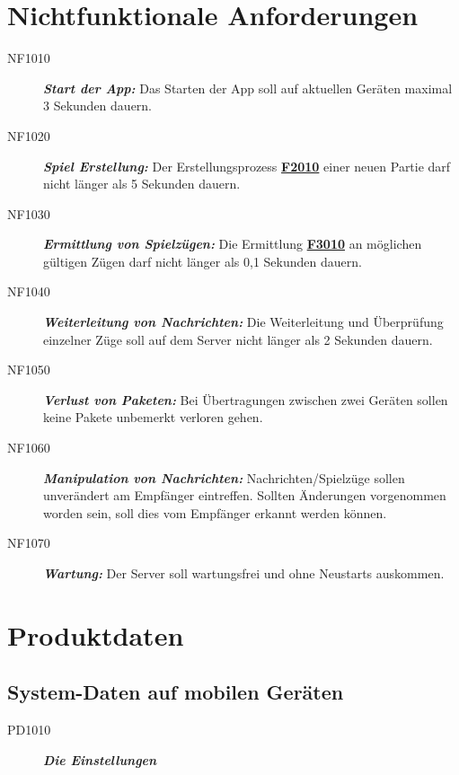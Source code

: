 \documentclass[parskip=full]{scrartcl}
\begin{document}
\section{Nichtfunktionale Anforderungen}
\begin{description}
	
	\item[NF1010] \textbf{\textit{Start der App: }} Das Starten der App soll auf aktuellen Geräten maximal 3 Sekunden dauern. 
	\item[NF1020] \textbf{\textit{Spiel Erstellung: }} Der Erstellungsprozess \hyperlink{F2010}{\textbf{F2010}} einer neuen Partie darf nicht länger als 5 Sekunden dauern.
	\item[NF1030] \textbf{\textit{Ermittlung von Spielzügen: }} Die Ermittlung \hyperlink{F3010}{\textbf{F3010}} an möglichen gültigen Zügen darf nicht länger als 0,1 Sekunden dauern.
	\item[NF1040] \textbf{\textit{Weiterleitung von Nachrichten: }} Die Weiterleitung und Überprüfung einzelner Züge soll auf dem Server nicht länger als 2 Sekunden dauern.
	\item[NF1050] \textbf{\textit{Verlust von Paketen: }} Bei Übertragungen zwischen zwei Geräten sollen keine Pakete unbemerkt verloren gehen.
	\item[NF1060] \textbf{\textit{Manipulation von Nachrichten: }} Nachrichten/Spielzüge sollen unverändert am Empfänger eintreffen. Sollten Änderungen vorgenommen worden sein, soll dies vom Empfänger erkannt werden können.
	\item[NF1070] \textbf{\textit{Wartung: }} Der Server soll wartungsfrei und ohne Neustarts auskommen.

	
\end{description}

\newpage
\section{Produktdaten}

\subsection{System-Daten auf mobilen Geräten}
\begin{description}
	
	\item[PD1010] \textbf{\textit{Die Einstellungen}}


\end{description}
\end{document}
